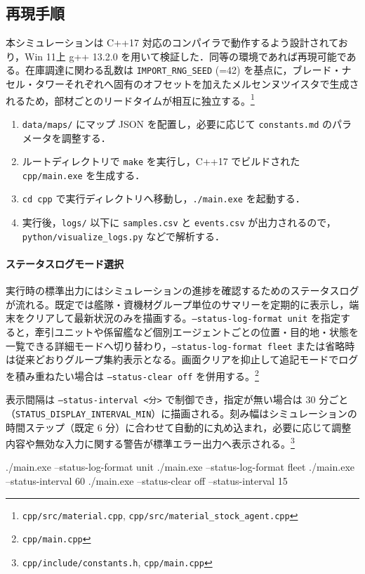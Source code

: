 \documentclass[10pt,letterpaper]{jsarticle}
\begin{document}
\subsection{再現手順}
本シミュレーションは C++17 対応のコンパイラで動作するよう設計されており，Win 11上 g++ 13.2.0 を用いて検証した．同等の環境であれば再現可能である。在庫調達に関わる乱数は \texttt{IMPORT\_RNG\_SEED} (=42) を基点に，ブレード・ナセル・タワーそれぞれへ固有のオフセットを加えたメルセンヌツイスタで生成されるため，部材ごとのリードタイムが相互に独立する。\footnote{\texttt{cpp/src/material.cpp}, \texttt{cpp/src/material\_stock\_agent.cpp}}
\begin{enumerate}
  \item \texttt{data/maps/} にマップ JSON を配置し，必要に応じて \texttt{constants.md} のパラメータを調整する．
  \item ルートディレクトリで \texttt{make} を実行し，C++17 でビルドされた \texttt{cpp/main.exe} を生成する．
  \item \texttt{cd cpp} で実行ディレクトリへ移動し，\texttt{./main.exe} を起動する．
  \item 実行後，\texttt{logs/} 以下に \texttt{samples.csv} と \texttt{events.csv} が出力されるので，\texttt{python/visualize\_logs.py} などで解析する．
\end{enumerate}

\paragraph{ステータスログモード選択}
実行時の標準出力にはシミュレーションの進捗を確認するためのステータスログが流れる。既定では艦隊・資機材グループ単位のサマリーを定期的に表示し，端末をクリアして最新状況のみを描画する。\texttt{--status-log-format unit} を指定すると，牽引ユニットや係留艦など個別エージェントごとの位置・目的地・状態を一覧できる詳細モードへ切り替わり，\texttt{--status-log-format fleet} または省略時は従来どおりグループ集約表示となる。画面クリアを抑止して追記モードでログを積み重ねたい場合は \texttt{--status-clear off} を併用する。\footnote{\texttt{cpp/main.cpp}}

表示間隔は \texttt{--status-interval <分>} で制御でき，指定が無い場合は 30 分ごと（\texttt{STATUS\_DISPLAY\_INTERVAL\_MIN}）に描画される。刻み幅はシミュレーションの時間ステップ（既定 6 分）に合わせて自動的に丸め込まれ，必要に応じて調整内容や無効な入力に関する警告が標準エラー出力へ表示される。\footnote{\texttt{cpp/include/constants.h}, \texttt{cpp/main.cpp}}

\begin{cmdcode}
./main.exe --status-log-format unit            %
./main.exe --status-log-format fleet           %
./main.exe --status-interval 60                %
./main.exe --status-clear off --status-interval 15  %
\end{cmdcode}
\end{document}
